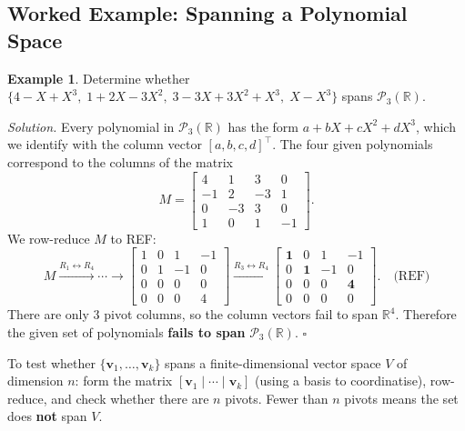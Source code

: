 \documentclass[11pt, a4paper, notitlepage]{report}
\theoremstyle{definition}
\newtheorem{example}[theorem]{Example}
\theoremstyle{remark}
\begin{document}
\subsection{Worked Example: Spanning a Polynomial Space}

\begin{example}\label{ex:poly-span}
Determine whether $\{4 - X + X^3,\; 1 + 2X - 3X^2,\; 3 - 3X + 3X^2 + X^3,\; X - X^3\}$ spans $\mathscr{P}_3(\mathbb{R})$.

\emph{Solution.} Every polynomial in $\mathscr{P}_3(\mathbb{R})$ has the form $a + bX + cX^2 + dX^3$, which we identify with the column vector $[a,b,c,d]^\top$. The four given polynomials correspond to the columns of the matrix
\[
  M = \begin{bmatrix}4&1&3&0\\-1&2&-3&1\\0&-3&3&0\\1&0&1&-1\end{bmatrix}.
\]
We row-reduce $M$ to REF:
\[
  M \xrightarrow{R_1\leftrightarrow R_4} \cdots \to
  \begin{bmatrix}1&0&1&-1\\0&1&-1&0\\0&0&0&0\\0&0&0&4\end{bmatrix}
  \xrightarrow{R_3\leftrightarrow R_4}
  \begin{bmatrix}\mathbf{1}&0&1&-1\\0&\mathbf{1}&-1&0\\0&0&0&\mathbf{4}\\0&0&0&0\end{bmatrix}. \quad \text{(REF)}
\]
There are only 3 pivot columns, so the column vectors fail to span $\mathbb{R}^4$. Therefore the given set of polynomials \textbf{fails to span} $\mathscr{P}_3(\mathbb{R})$. $\square$
\end{example}

\begin{examtip}[title={Exam Tip: Testing Whether Vectors Span a Space}]
To test whether $\{\mathbf{v}_1,\ldots,\mathbf{v}_k\}$ spans a finite-dimensional vector space $V$ of dimension $n$: form the matrix $[\mathbf{v}_1 \mid \cdots \mid \mathbf{v}_k]$ (using a basis to coordinatise), row-reduce, and check whether there are $n$ pivots. Fewer than $n$ pivots means the set does \textbf{not} span $V$.
\end{examtip}

\end{document}
